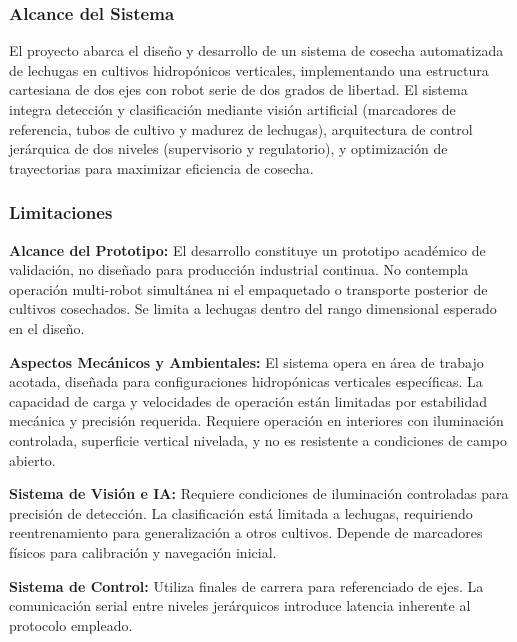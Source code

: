 \subsubsection{Alcance del Sistema}

El proyecto abarca el diseño y desarrollo de un sistema de cosecha automatizada de lechugas en cultivos hidropónicos verticales, implementando una estructura cartesiana de dos ejes con robot serie de dos grados de libertad. El sistema integra detección y clasificación mediante visión artificial (marcadores de referencia, tubos de cultivo y madurez de lechugas), arquitectura de control jerárquica de dos niveles (supervisorio y regulatorio), y optimización de trayectorias para maximizar eficiencia de cosecha.

\subsubsection{Limitaciones}

\textbf{Alcance del Prototipo:} El desarrollo constituye un prototipo académico de validación, no diseñado para producción industrial continua. No contempla operación multi-robot simultánea ni el empaquetado o transporte posterior de cultivos cosechados. Se limita a lechugas dentro del rango dimensional esperado en el diseño.

\textbf{Aspectos Mecánicos y Ambientales:} El sistema opera en área de trabajo acotada, diseñada para configuraciones hidropónicas verticales específicas. La capacidad de carga y velocidades de operación están limitadas por estabilidad mecánica y precisión requerida. Requiere operación en interiores con iluminación controlada, superficie vertical nivelada, y no es resistente a condiciones de campo abierto.

\textbf{Sistema de Visión e IA:} Requiere condiciones de iluminación controladas para precisión de detección. La clasificación está limitada a lechugas, requiriendo reentrenamiento para generalización a otros cultivos. Depende de marcadores físicos para calibración y navegación inicial.

\textbf{Sistema de Control:} Utiliza finales de carrera para referenciado de ejes. La comunicación serial entre niveles jerárquicos introduce latencia inherente al protocolo empleado.


